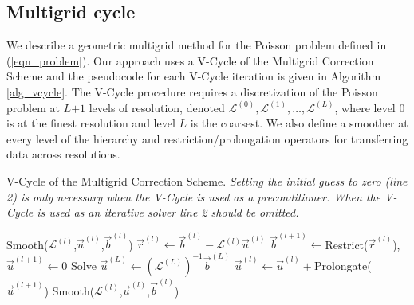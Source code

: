 \subsection{Multigrid cycle}
\label{sec_cycle}
We describe a geometric multigrid method for the Poisson problem defined in (\ref{eqn_problem}). Our approach uses a V-Cycle of the Multigrid Correction Scheme
\cite{trottenberg:2001:multigrid} and the pseudocode for each V-Cycle iteration is given in Algorithm \ref{alg_vcycle}. The V-Cycle procedure requires a discretization of the Poisson
problem at $L$$+$$1$ levels of resolution, denoted $\mathcal{L}^{(0)},\mathcal{L}^{(1)},\ldots,\mathcal{L}^{(L)}$, where level $0$ is at the finest resolution and level $L$ is the
coarsest. We also define a smoother at every level of the hierarchy and restriction/prolongation operators for transferring data across resolutions.

\begin{algorithm}[h]
\caption[V-Cycle of the Multigrid Correction Scheme.]{V-Cycle of the Multigrid Correction Scheme.
\textit{Setting the initial guess to zero (line 2) is only necessary when the V-Cycle is used as a preconditioner. When the
  V-Cycle is used as an iterative solver line 2 should be omitted.}}
\label{alg_vcycle}
\begin{algorithmic}[1]
\State Smooth($\mathcal{L}^{(l)}$,$\vec{u}^{(l)}$,$\vec{b}^{(l)}$)
\State $\vec{r}^{(l)}\gets\vec{b}^{(l)}-\mathcal{L}^{(l)}\vec{u}^{(l)}$
\State $\vec{b}^{(l+1)}\gets$Restrict($\vec{r}^{(l)}$),\ $\vec{u}^{(l+1)}\gets 0$
\EndFor
\State Solve $\vec{u}^{(L)}\gets (\mathcal{L}^{(L)})^{-1}\vec{b}^{(L)}$
\State $\vec{u}^{(l)}\gets \vec{u}^{(l)}+$Prolongate($\vec{u}^{(l+1)}$)
\State Smooth($\mathcal{L}^{(l)}$,$\vec{u}^{(l)}$,$\vec{b}^{(l)}$)
\EndFor
\EndProcedure
\end{algorithmic}
\end{algorithm}

